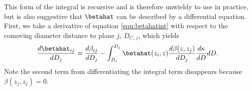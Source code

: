 This form of the integral is recursive and is therefore unwieldy to use in practice, but is also suggestive that $\betahat$ can be described by a differential equation. First, we take a derivative of equation \ref{eqn:betahatint} with respect to the comoving diameter distance to plane $j$, $D_{C, \, j}$, which yields
\begin{equation}
\frac{d\betahat_{i j}}{d D_j} = \frac{d\beta_{i j}}{d D_j} - \int_{D_i}^{D_j} \betahat(z_i, z) \frac{d \beta(z, z_j)}{d D_j} \frac{d \kappa}{d D} d D.
\end{equation}
Note the second term from differentiating the integral term disappears because $\beta(z_j, z_j) = 0$. 
  
  
  
  